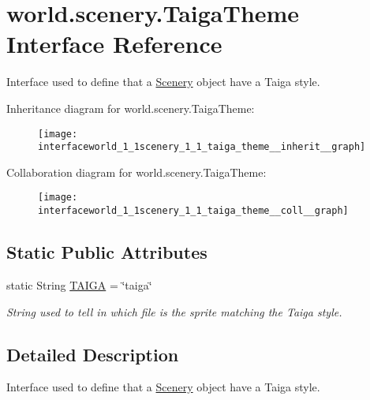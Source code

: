 \hypertarget{interfaceworld_1_1scenery_1_1_taiga_theme}{\section{world.\-scenery.\-Taiga\-Theme Interface Reference}
\label{interfaceworld_1_1scenery_1_1_taiga_theme}
}


Interface used to define that a \hyperlink{classworld_1_1scenery_1_1_scenery}{Scenery} object have a Taiga style.  




Inheritance diagram for world.\-scenery.\-Taiga\-Theme\-:
\nopagebreak
\begin{figure}[H]
\begin{center}
\leavevmode
\texttt{[image: interfaceworld\_1\_1scenery\_1\_1\_taiga\_theme\_\_inherit\_\_graph]}
\end{center}
\end{figure}


Collaboration diagram for world.\-scenery.\-Taiga\-Theme\-:
\nopagebreak
\begin{figure}[H]
\begin{center}
\leavevmode
\texttt{[image: interfaceworld\_1\_1scenery\_1\_1\_taiga\_theme\_\_coll\_\_graph]}
\end{center}
\end{figure}
\subsection*{Static Public Attributes}
\begin{DoxyCompactItemize}
\item 
static String \hyperlink{interfaceworld_1_1scenery_1_1_taiga_theme_ad3418d8f4936efb0ef1e3eb2009a34f0}{T\-A\-I\-G\-A} = \char`\"{}taiga\char`\"{}
\begin{DoxyCompactList}\small\item\em String used to tell in which file is the sprite matching the Taiga style. \end{DoxyCompactList}\end{DoxyCompactItemize}


\subsection{Detailed Description}
Interface used to define that a \hyperlink{classworld_1_1scenery_1_1_scenery}{Scenery} object have a Taiga style. 

